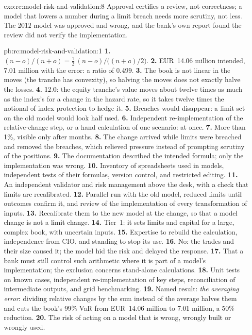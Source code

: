 \begin{solution}{exo:rc:model-risk-and-validation:8}
Approval certifies a review, not correctness; a model that lowers a number during a limit breach needs
more scrutiny, not less. The 2012 model was approved and wrong, and the bank's own report found the
review did not verify the implementation.
\end{solution}

\begin{solution}{pb:rc:model-risk-and-validation:1}
\textbf{1.} $(n-o)/(n+o) = \tfrac12\,(n-o)/\bigl((n+o)/2\bigr)$.
\textbf{2.} EUR~14.06 million intended, 7.01 million with the error: a ratio of 0.499.
\textbf{3.} The book is not linear in the moves (the tranche has convexity), so halving the moves does not
exactly halve the losses.
\textbf{4.} 12.0: the equity tranche's value moves about twelve times as much as the index's for a change
in the hazard rate, so it takes twelve times the notional of index protection to hedge it.
\textbf{5.} Breaches would disappear: a limit set on the old model would look half used.
\textbf{6.} Independent re-implementation of the relative-change step, or a hand calculation of one
scenario: at once.
\textbf{7.} More  than 1\%, visible only after months.
\textbf{8.} The change arrived while limits were breached and removed the breaches, which relieved pressure
instead of prompting scrutiny of the positions.
\textbf{9.} The documentation described the intended formula; only the implementation was wrong.
\textbf{10.} Inventory of spreadsheets used in models, independent tests of their formulas, version control,
and restricted editing.
\textbf{11.} An independent validator and risk management above the desk, with a check that limits are
recalibrated.
\textbf{12.} Parallel run with the old model, reduced limits until outcomes confirm it, and review of the
implementation of every transformation of inputs.
\textbf{13.} Recalibrate them to the new model at the change, so that a model change is not a limit change.
\textbf{14.} Tier~1: it sets limits and capital for a large, complex book, with uncertain inputs.
\textbf{15.} Expertise to rebuild the calculation, independence from CIO, and standing to stop its use.
\textbf{16.} No: the trades and their size caused it; the model hid the risk and delayed the response.
\textbf{17.} That a bank must still control such arithmetic where it is part of a model's implementation;
the exclusion concerns stand-alone calculations.
\textbf{18.} Unit tests on known cases, independent re-implementation of key steps, reconciliation of
intermediate outputs, and grid benchmarking.
\textbf{19.} Named result: \emph{the averaging error}: dividing relative changes by the sum instead of the
average halves them and cuts the book's 99\% VaR from EUR~14.06 million to 7.01 million, a 50\% reduction.
\textbf{20.} The risk of acting on a model that is wrong, wrongly built or wrongly used.
\end{solution}

